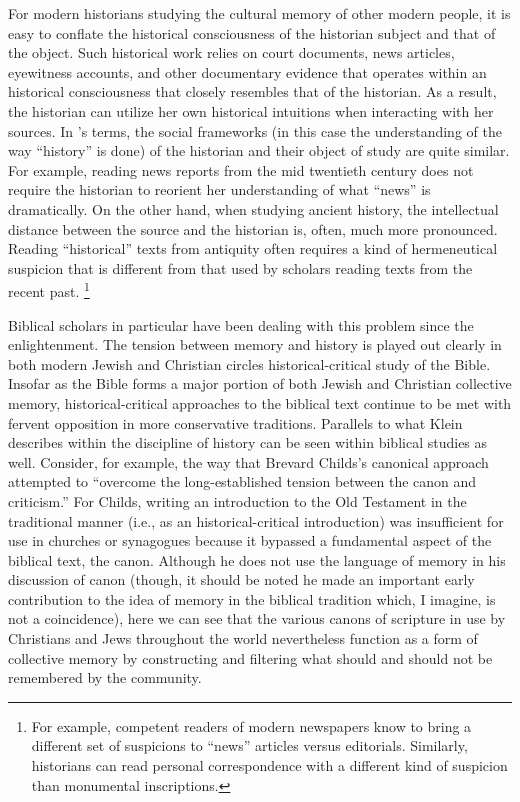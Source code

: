 For modern historians studying the cultural memory of other modern people, it is easy to conflate the historical consciousness of the historian subject and that of the object. Such historical work relies on court documents, news articles, eyewitness accounts, and other documentary evidence that operates within an historical consciousness that closely resembles that of the historian. As a result, the historian can utilize her own historical intuitions when interacting with her sources. In \halbwachs's terms, the social frameworks (in this case the understanding of the way ``history'' is done) of the historian and their object of study are quite similar. For example, reading news reports from the mid twentieth century does not require the historian to reorient her understanding of what ``news'' is dramatically. On the other hand, when studying ancient history, the intellectual distance between the source and the historian is, often, much more pronounced. Reading ``historical'' texts from antiquity often requires a kind of hermeneutical suspicion that is different from that used by scholars reading texts from the recent past.%
    \footnote{%
        For example, competent readers of modern newspapers know to bring a different set of suspicions to ``news'' articles versus editorials. Similarly, historians can read personal correspondence with a different kind of suspicion than monumental inscriptions.}

Biblical scholars in particular have been dealing with this problem since the enlightenment. The tension between memory and history is played out clearly in both modern Jewish and Christian circles \visavis historical-critical study of the Bible. Insofar as the Bible forms a major portion of both Jewish and Christian collective memory, historical-critical approaches to the biblical text continue to be met with fervent opposition in more conservative traditions. Parallels to what Klein describes within the discipline of history can be seen within biblical studies as well. Consider, for example, the way that Brevard Childs's canonical approach attempted to ``overcome the long-established tension between the canon and criticism.''%
    \autocite[45]{childs1979}
For Childs, writing an introduction to the Old Testament in the traditional manner (i.e., as an historical-critical introduction) was insufficient for use in churches or synagogues because it bypassed a fundamental aspect of the biblical text, the canon. Although he does not use the language of memory in his discussion of canon (though, it should be noted he made an important early contribution to the idea of memory in the biblical tradition which, I imagine, is not a coincidence),%
    \autocite{childs1962}
here we can see that the various canons of scripture in use by Christians and Jews throughout the world nevertheless function as a form of collective memory by constructing and filtering what should and should not be remembered by the community.  

